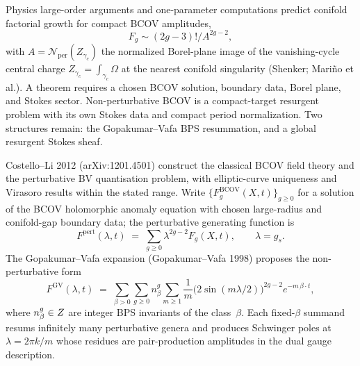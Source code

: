 \documentclass[12pt]{amsart}
\theoremstyle{remark}
\begin{document}
Physics large-order arguments and one-parameter computations predict
conifold factorial growth for compact BCOV amplitudes,
\[
  F_g\sim (2g-3)!/A^{2g-2},
\]
with \(A=\mathcal N_{\mathrm{per}}(Z_{\gamma_c})\) the normalized
Borel-plane image of the vanishing-cycle central charge
\(Z_{\gamma_c}=\int_{\gamma_c}\Omega\) at the nearest conifold
singularity (Shenker; Mari\~no et al.).  A
theorem requires a chosen BCOV solution, boundary data, Borel plane,
and Stokes sector.  Non-perturbative BCOV is a compact-target
resurgent problem with its own Stokes data and compact period
normalization.  Two structures remain: the Gopakumar--Vafa BPS
resummation, and a global resurgent Stokes sheaf.

Costello--Li 2012 (arXiv:1201.4501) construct the classical BCOV field
theory and the perturbative BV quantisation problem, with
elliptic-curve uniqueness and Virasoro results within the stated
range.  Write \(\{F_g^{\mathrm{BCOV}}(X,t)\}_{g\geq 0}\)
for a solution of the BCOV holomorphic anomaly equation with chosen
large-radius and conifold-gap boundary data; the perturbative
generating function is
\[
  F^{\mathrm{pert}}(\lambda,t) \;=\; \sum_{g\geq 0}\lambda^{2g-2}F_g(X,t),
  \qquad \lambda=g_s.
\]
The Gopakumar--Vafa expansion (Gopakumar--Vafa 1998) proposes the
non-perturbative form
\begin{equation}\label{eq:gv-expansion}
  F^{\mathrm{GV}}(\lambda,t) \;=\; \sum_{\beta>0}\sum_{g\geq 0}n_\beta^g
    \sum_{m\geq 1}\frac{1}{m}\bigl(2\sin(m\lambda/2)\bigr)^{2g-2}
    e^{-m\,\beta\cdot t},
\end{equation}
where \(n_\beta^g\in Z\) are integer BPS invariants of the
class~\(\beta\).  Each fixed-\(\beta\) summand resums infinitely many
perturbative genera and produces Schwinger poles at \(\lambda=2\pi k/m\)
whose residues are pair-production amplitudes in the dual gauge
description.
\end{document}
